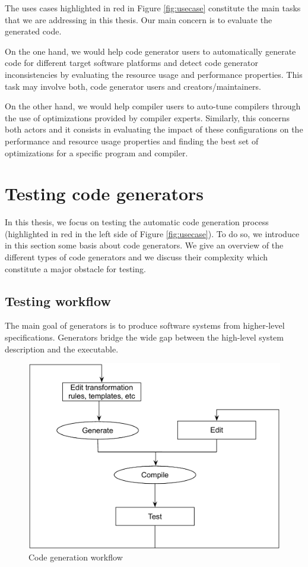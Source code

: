 The uses cases highlighted in red in Figure \ref{fig:usecase} constitute the main tasks that we are addressing in this thesis. Our main concern is to evaluate the generated code.

On the one hand, we would help code generator users to automatically generate code for different target software platforms and detect code generator inconsistencies by evaluating the resource usage and performance properties. This task may involve both, code generator users and creators/maintainers.

On the other hand, we would help compiler users to auto-tune compilers through the use of optimizations provided by compiler experts. Similarly, this concerns both actors and it consists in evaluating the impact of these configurations on the performance and resource usage properties and finding the best set of optimizations for a specific program and compiler.


\section{Testing code generators}
In this thesis, we focus on testing the automatic code generation process (highlighted in red in the left side of Figure \ref{fig:usecase}). To do so, we introduce in this section some basis about code generators. We give an overview of the different types of code generators and we discuss their complexity which constitute a major obstacle for testing.
\subsection{Testing workflow}
The main goal of generators is to produce software systems from higher-level specifications. Generators bridge the wide gap between the high-level system description and the executable.
\begin{figure}[h]
	\center
	\includegraphics[scale=0.7]{Background/fig/workflow}
	\caption{Code generation workflow}
	\label{fig:workflow}
\end{figure}

